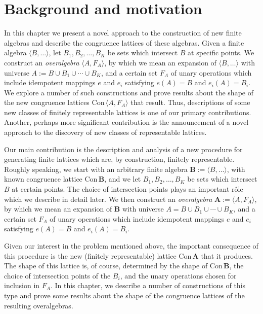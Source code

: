 \documentclass[cm,dissertation]{uhthesis}
\theoremstyle{plain}
\theoremstyle{definition}
\theoremstyle{remark}
\numberwithin{theorem}{section}
\numberwithin{claim}{chapter}
\numberwithin{equation}{section}
\numberwithin{conjecture}{chapter}
\newcommand{\<}{\ensuremath{\langle}}
\renewcommand{\>}{\ensuremath{\rangle}}
\newcommand{\Con}{\ensuremath{\mathrm{Con\,}}}
\newcommand{\0}{\ensuremath{\mathbf{0}}}
\newcommand{\1}{\ensuremath{\mathbf{1}}}
\newcommand{\2}{\ensuremath{\mathbf{2}}}
\newcommand{\3}{\ensuremath{\mathbf{3}}}
\newcommand{\4}{\ensuremath{\mathbf{4}}}
\newcommand{\5}{\ensuremath{\mathbf{5}}}
\newcommand{\bA}{\ensuremath{\mathbf{A}}}
\newcommand{\bB}{\ensuremath{\mathbf{B}}}
\begin{document}
\section{Background and motivation}
In this chapter  we present a novel approach to the construction of new finite
algebras and describe the congruence lattices of these algebras. Given a finite
algebra $\<B, \dots\>$, let $B_1, B_2, \dots, B_K$ be sets which intersect $B$
at specific points. We construct an  {\it overalgebra} $\<A, F_A\>$, by which we
mean an expansion of $\<B, \dots\>$ with universe  $A := B \cup B_1 \cup \cdots
\cup B_K$,  and a certain set $F_A$ of unary operations which include idempotent
mappings $e$ and $e_i$ satisfying $e(A) = B$ and $e_i(A) = B_i$.  We explore a
number of such constructions and prove results about the shape of the new
congruence lattices $\Con \<A, F_A\>$ that result. Thus, descriptions of some
new classes of finitely representable lattices is one of our primary
contributions. 
Another, perhaps more significant contribution is the announcement of a
novel approach to the discovery of new classes of representable lattices.

Our main contribution is the description and analysis of a
new procedure for generating finite lattices which are, by
construction, finitely representable.  
Roughly speaking, we start with an arbitrary finite algebra $\bB := \<B,
\dots\>$, with known congruence lattice $\Con\bB$, and we let $B_1, B_2, \dots,
B_K$ be sets which intersect $B$ at certain points.  The choice of intersection
points plays an important r\^ole which we describe in detail later.  We then
construct an  {\it overalgebra} $\bA:=\<A, F_A\>$, by which we mean an expansion of $\bB$
with universe $A = B \cup B_1 \cup \cdots \cup B_K$,  and a certain set $F_A$ of
unary operations which include idempotent mappings $e$ and $e_i$
satisfying $e(A) = B$ and $e_i(A) = B_i$.  

Given our interest in the problem mentioned above, the important consequence of
this procedure is the new (finitely representable) lattice $\Con\bA$ that
it produces.  The shape of this lattice is, of course, determined by
the shape of $\Con\bB$, the choice of intersection points of the $B_i$, and the
unary operations chosen for inclusion in $F_A$.  In this chapter, we
describe a number of constructions of this type and prove some results 
about the shape of the congruence lattices of the resulting overalgebras.  
\end{document}
